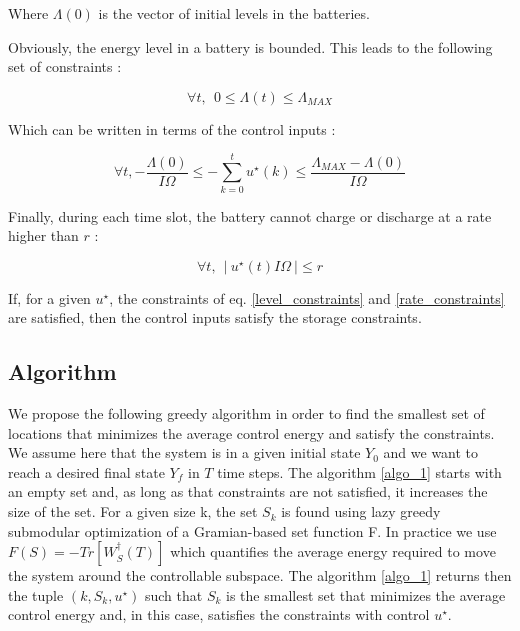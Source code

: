 \documentclass[10pt,twoside%
                ,draft%
        ]{article}
\begin{document}
Where $ \Lambda(0) $ is the vector of initial levels in the batteries.

Obviously, the energy level in a battery is bounded. This leads to the following set of constraints : 

\begin{equation}
 \forall t, \ \ 0 \leq \Lambda(t) \leq \Lambda_{MAX}
\end{equation}
 
Which can be written in terms of the control inputs :

\begin{equation}
\label{level_constraints}
\forall t,-\frac{\Lambda(0)}{I \Omega} \leq -\sum_{k=0}^{t}u^{\star}(k) \leq \frac{ \Lambda_{MAX} - \Lambda(0)}{I \Omega}
\end{equation}

Finally, during each time slot, the battery cannot charge or discharge at a rate higher than $ r $ : 

\begin{equation}
\label{rate_constraints}
 \forall t,\ \ \left|\ u^{\star}(t)I \Omega\ \right| \leq r 
 \end{equation}

If, for a given $ u^{\star} $, the constraints of eq. \ref{level_constraints} and \ref{rate_constraints} are satisfied, then the control inputs satisfy the storage constraints.

\subsection{Algorithm}

We propose the following greedy algorithm in order to find the smallest set of locations that minimizes the average control energy and satisfy the constraints. We assume here that the system is in a given initial state $ Y_0 $ and we want to reach a desired final state $ Y_f$  in $ T $ time steps. The algorithm \ref{algo_1} starts with an empty set and, as long as that constraints are not satisfied, it increases the size of the set. For a given size k, the set $ S_k $ is found using lazy greedy submodular optimization of a Gramian-based set function F. In practice we use $ F(S) = -Tr \left[ W_S^{\dagger}(T) \right] $ which quantifies the average energy required to move the system around the controllable subspace. The algorithm \ref{algo_1} returns then the tuple $ (k,S_k,u^{\star}) $ such that $ S_k $ is the smallest set that minimizes the average control energy and, in this case, satisfies the constraints with control $u^{\star}$. 
\end{document}
